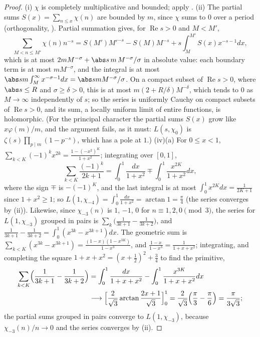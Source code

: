 \begin{proof}
(i) $\chi$ is completely multiplicative and bounded; apply . (ii) The partial sums $S(x)=\sum_{n\le x}\chi(n)$ are bounded by $m$, since $\chi$
sums to $0$ over a period (orthogonality, ). Partial summation gives, for $\operatorname{Re}s>0$ and $M<M'$,
\[
\sum_{M<n\le M'}\chi(n)n^{-s}=S(M')M'^{-s}-S(M)M^{-s}+s\int_M^{M'}S(x)x^{-s-1}dx,
\]
which is at most $2mM^{-\sigma}+\abs s\,m\,M^{-\sigma}/\sigma$ in absolute value: each boundary term is at most $mM^{-\sigma}$, and the integral is at most
$\abs sm\int_M^\infty x^{-\sigma-1}dx=\abs smM^{-\sigma}/\sigma$. On a compact subset of $\operatorname{Re}s>0$, where $\abs s\le R$ and $\sigma\ge\delta>0$, this is at most
$m(2+R/\delta)M^{-\delta}$, which tends to $0$ as $M\to\infty$ independently of $s$; so the series is uniformly Cauchy on compact subsets of $\operatorname{Re}s>0$, and its sum, a locally
uniform limit of entire functions, is holomorphic. (For the principal character the partial sums $S(x)$ grow like $x\varphi(m)/m$, and the argument fails, as it must: $L(s,\chi_0)$
is $\zeta(s)\prod_{p\mid m}(1-p^{-s})$, which has a pole at $1$.) (iv)(a) For $0\le x<1$, $\sum_{k<K}(-1)^kx^{2k}=\frac{1-(-x^2)^K}{1+x^2}$; integrating over $[0,1]$,
\[
\sum_{k<K}\frac{(-1)^k}{2k+1}=\int_0^1\frac{dx}{1+x^2}\mp\int_0^1\frac{x^{2K}}{1+x^2}dx,
\]
where the sign $\mp$ is $-(-1)^K$, and the last integral is at most $\int_0^1x^{2K}dx=\frac1{2K+1}$ since $1+x^2\ge1$; so $L(1,\chi_{-4})=\int_0^1\frac{dx}{1+x^2}=\arctan1=\frac\pi4$ (the
series converges by (ii)). Likewise, since $\chi_{-3}(n)$ is $1$, $-1$, $0$ for $n\equiv1,2,0\pmod3$, the series for $L(1,\chi_{-3})$ grouped in pairs is $\sum_k\bigl(\frac1{3k+1}-\frac1{3k+2}\bigr)$, and
$\frac1{3k+1}-\frac1{3k+2}=\int_0^1(x^{3k}-x^{3k+1})dx$. The geometric sum is $\sum_{k<K}(x^{3k}-x^{3k+1})=\frac{(1-x)(1-x^{3K})}{1-x^3}$, and $\frac{1-x}{1-x^3}=\frac1{1+x+x^2}$; integrating, and
completing the square $1+x+x^2=(x+\frac12)^2+\frac34$ to find the primitive,
\begin{align*}
\sum_{k<K}\Bigl(\frac1{3k+1}-\frac1{3k+2}\Bigr)&=\int_0^1\frac{dx}{1+x+x^2}-\int_0^1\frac{x^{3K}}{1+x+x^2}dx\\
&\longrightarrow\Bigl[\frac2{\sqrt3}\arctan\frac{2x+1}{\sqrt3}\Bigr]_0^1=\frac2{\sqrt3}\Bigl(\frac\pi3-\frac\pi6\Bigr)=\frac\pi{3\sqrt3};
\end{align*}
the partial sums grouped in pairs converge to $L(1,\chi_{-3})$, because $\chi_{-3}(n)/n\to0$ and the series converges by (ii).
\end{proof}

